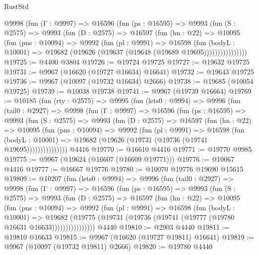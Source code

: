 \begin{lexlean}{RustStd}
\begin{coremodule}
          @9998
            (fun (Γ : @9997) =>
            @16596
              (fun (ps : @16595) =>
              @9993
                (fun (S : @2575) =>
                @9993
                  (fun (D : @2575) =>
                  @16597
                    (fun (hn : @22) =>
                    @10095
                      (fun (pns : @10094) =>
                      @9992
                        (fun (pl : @9991) =>
                        @16598
                          (fun (bodyL : @10001) =>
                          @19682 (@19626 (@19637 (@19648 (@19689 @19695))))))))))))))))
@19725 := @4400 @3804
@19726 := @19724 @19725
@19727 := @19632 @19725
@19731 := @9967 (@16620 (@19727 @16634) @16641)
@19732 := @19643 @19725
@19736 := @9967 (@10097 (@19732 @16634) @2666)
@19738 := @19685 (@10054 @19725)
@19739 := @10038 @19738
@19741 := @9967 (@19739 @16664)
@19769 := @10185
    (fun (rty : @2575) =>
    @9995
      (fun (lets0 : @9994) =>
      @9996
        (fun (tail0 : @2927) =>
        @9998
          (fun (Γ : @9997) =>
          @16596
            (fun (ps : @16595) =>
            @9993
              (fun (S : @2575) =>
              @9993
                (fun (D : @2575) =>
                @16597
                  (fun (hn : @22) =>
                  @10095
                    (fun (pns : @10094) =>
                    @9992
                      (fun (pl : @9991) =>
                      @16598
                        (fun (bodyL : @10001) =>
                        @19682 (@19626 (@19731 (@19736 (@19741 @19695)))))))))))))))
    @4416
@19770 := @16610 @4416
@19771 := @19770 @9985
@19775 := @9967 (@19624 (@16607 (@16609 @19771)))
@19776 := @10067 @4416
@19777 := @16667 @19776
@19780 := @10070 @19776 @19690 @15615
@19809 := @10207
    (fun (lets0 : @9994) =>
    @9996
      (fun (tail0 : @2927) =>
      @9998
        (fun (Γ : @9997) =>
        @16596
          (fun (ps : @16595) =>
          @9993
            (fun (S : @2575) =>
            @9993
              (fun (D : @2575) =>
              @16597
                (fun (hn : @22) =>
                @10095
                  (fun (pns : @10094) =>
                  @9992
                    (fun (pl : @9991) =>
                    @16598
                      (fun (bodyL : @10001) =>
                      @19682
                        (@19775
                          (@19731 (@19736 (@19741 (@19777 (@19780 @16631 @16633))))))))))))))))
    @4440
@19810 := @2903 @4440
@19811 := @19810 @16633
@19815 := @9967 (@16620 (@19727 @19811) @16641)
@19819 := @9967 (@10097 (@19732 @19811) @2666)
@19820 := @19780 @4440

\end{coremodule}
\end{lexlean}
